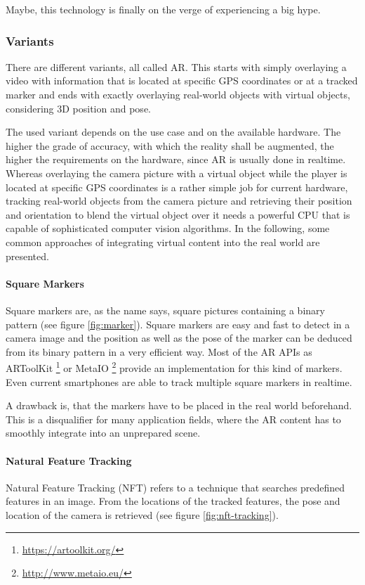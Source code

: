 Maybe, this technology is finally on the verge of experiencing a big hype.

\subsubsection{Variants}
There are different variants, all called AR. This starts with simply overlaying a video with information that is located at specific GPS coordinates or at a tracked marker and ends with exactly overlaying real-world objects with virtual objects, considering 3D position and pose.

The used variant depends on the use case and on the available hardware. The higher the grade of accuracy, with which the reality shall be augmented, the higher the requirements on the hardware, since AR is usually done in realtime. Whereas overlaying the camera picture with a virtual object while the player is located at specific GPS coordinates is a rather simple job for current hardware, tracking real-world objects from the camera picture and retrieving their position and orientation to blend the virtual object over it needs a powerful CPU that is capable of sophisticated computer vision algorithms. In the following, some common approaches of integrating virtual content into the real world are presented.

\paragraph{Square Markers}
Square markers are, as the name says, square pictures containing a binary pattern (see figure \ref{fig:marker}). Square markers are easy and fast to detect in a camera image and the position as well as the pose of the marker can be deduced from its binary pattern in a very efficient way. Most of the AR APIs as ARToolKit \footnote{\url{https://artoolkit.org/}} or MetaIO \footnote{\url{http://www.metaio.eu/}} provide an implementation for this kind of markers. Even current smartphones are able to track multiple square markers in realtime.

A drawback is, that the markers have to be placed in the real world beforehand. This is a disqualifier for many application fields, where the AR content has to smoothly integrate into an unprepared scene.

\paragraph{Natural Feature Tracking}
Natural Feature Tracking (NFT) refers to a technique that searches predefined features in an image. From the locations of the tracked features, the pose and location of the camera is retrieved \citep{neumann1999natural} (see figure \ref{fig:nft-tracking}).

